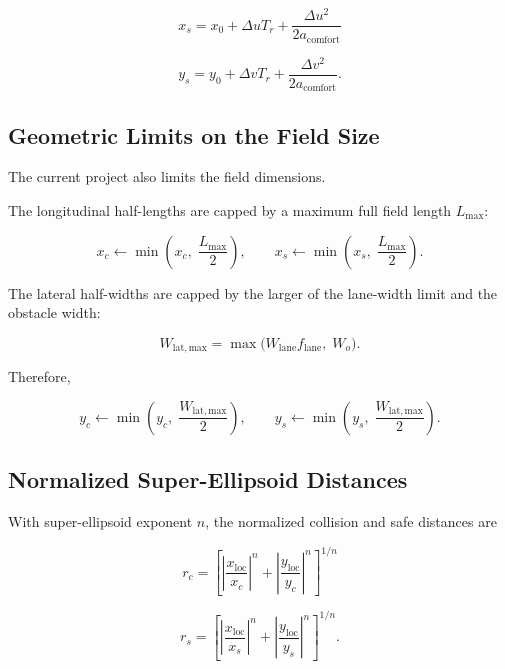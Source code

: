 \documentclass[11pt]{article}
\begin{document}
\begin{equation}
x_s = x_0 + \Delta u T_r + \frac{\Delta u^2}{2a_{\mathrm{comfort}}}
\end{equation}

\begin{equation}
y_s = y_0 + \Delta v T_r + \frac{\Delta v^2}{2a_{\mathrm{comfort}}}.
\end{equation}

\subsection{Geometric Limits on the Field Size}

The current project also limits the field dimensions.

The longitudinal half-lengths are capped by a maximum full field length
$L_{\max}$:

\begin{equation}
x_c \leftarrow \min\left(x_c,\; \frac{L_{\max}}{2}\right),
\qquad
x_s \leftarrow \min\left(x_s,\; \frac{L_{\max}}{2}\right).
\end{equation}

The lateral half-widths are capped by the larger of the lane-width limit and
the obstacle width:

\begin{equation}
W_{\mathrm{lat,max}} = \max\!\big(W_{\mathrm{lane}} f_{\mathrm{lane}},\; W_o\big).
\end{equation}

Therefore,

\begin{equation}
y_c \leftarrow \min\left(y_c,\; \frac{W_{\mathrm{lat,max}}}{2}\right),
\qquad
y_s \leftarrow \min\left(y_s,\; \frac{W_{\mathrm{lat,max}}}{2}\right).
\end{equation}

\subsection{Normalized Super-Ellipsoid Distances}

With super-ellipsoid exponent $n$, the normalized collision and safe distances are

\begin{equation}
r_c
=
\left[
\left|\frac{x_{\mathrm{loc}}}{x_c}\right|^n
+
\left|\frac{y_{\mathrm{loc}}}{y_c}\right|^n
\right]^{1/n}
\end{equation}

\begin{equation}
r_s
=
\left[
\left|\frac{x_{\mathrm{loc}}}{x_s}\right|^n
+
\left|\frac{y_{\mathrm{loc}}}{y_s}\right|^n
\right]^{1/n}.
\end{equation}
\end{document}
